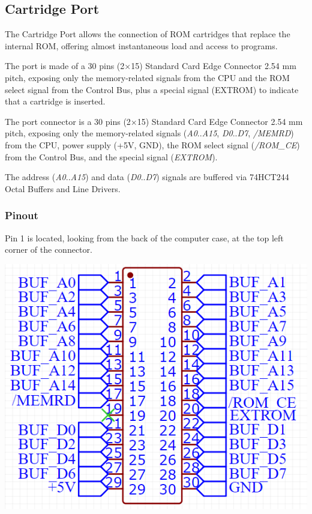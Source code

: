 \documentclass[a4paper,11pt]{article}
\begin{document}
    \subsection{Cartridge Port}

    The Cartridge Port allows the connection of ROM cartridges that replace the
    internal ROM, offering almost instantaneous load and access to programs.

    The port is made of a 30 pins (2×15) Standard Card Edge Connector 2.54 mm
    pitch, exposing only the memory-related signals from the CPU and the ROM
    select signal from the Control Bus, plus a special signal (EXTROM) to
    indicate that a cartridge is inserted.

    The port connector is a 30 pins (2×15) Standard Card Edge Connector 2.54 mm
    pitch, exposing only the memory-related signals (\textit{A0}..\textit{A15},
    \textit{D0}..\textit{D7}, \textit{/MEMRD}) from the CPU, power supply (+5V,
    GND), the ROM select signal (\textit{/ROM\_CE}) from the Control Bus, and
    the special signal (\textit{EXTROM}).

    The address (\textit{A0}..\textit{A15}) and data (\textit{D0}..\textit{D7})
    signals are buffered via 74HCT244 Octal Buffers and Line Drivers.

        \subsubsection{Pinout}

        Pin 1 is located, looking from the back of the computer case, at the top
        left corner of the connector.

        \includegraphics[scale=0.6]{images/cartridgeportpinout.png}
\end{document}
